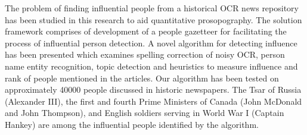 The problem of finding influential people from a historical OCR news repository has been studied in this research to aid quantitative prosopography. The solution framework comprises of development of a people gazetteer for facilitating the process of influential person detection. A novel algorithm for detecting influence has been presented which examines spelling correction of noisy OCR, person name entity recognition, topic detection and heuristics to measure influence and rank of people mentioned in the articles. Our algorithm has been tested on approximately 40000 people discussed in historic newspapers. The Tsar of Russia (Alexander III), the first and fourth Prime Ministers of Canada (John McDonald and John Thompson), and English soldiers serving in World War I (Captain Hankey) are among the influential people identified by the algorithm.




%
%
